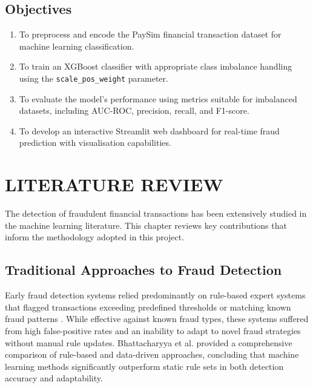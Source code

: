 \documentclass[12pt,a4paper]{report}
\begin{document}
\section{Objectives}

\begin{enumerate}
    \item To preprocess and encode the PaySim financial transaction dataset for machine learning classification.
    \item To train an XGBoost classifier with appropriate class imbalance handling using the \mbox{\texttt{scale\_pos\_weight}} parameter.
    \item To evaluate the model's performance using metrics suitable for imbalanced datasets, including AUC-ROC, precision, recall, and F1-score.
    \item To develop an interactive Streamlit web dashboard for real-time fraud prediction with visualisation capabilities.
\end{enumerate}

\chapter{LITERATURE REVIEW}

The detection of fraudulent financial transactions has been extensively studied in the machine learning literature. This chapter reviews key contributions that inform the methodology adopted in this project.

\section{Traditional Approaches to Fraud Detection}

Early fraud detection systems relied predominantly on rule-based expert systems that flagged transactions exceeding predefined thresholds or matching known fraud patterns \cite{bolton2002statistical}. While effective against known fraud types, these systems suffered from high false-positive rates and an inability to adapt to novel fraud strategies without manual rule updates. Bhattacharyya et al. \cite{bhattacharyya2011data} provided a comprehensive comparison of rule-based and data-driven approaches, concluding that machine learning methods significantly outperform static rule sets in both detection accuracy and adaptability.
\end{document}
